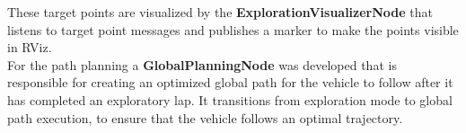 These target points are visualized by the \textbf{ExplorationVisualizerNode} that listens to target point messages and publishes a marker to make the points visible in RViz.\\
\newline
For the path planning a \textbf{GlobalPlanningNode} was developed that is responsible for creating an optimized global path for the vehicle to follow after it has completed an exploratory lap. It transitions from exploration mode to global path execution, to ensure that the vehicle follows an optimal trajectory.